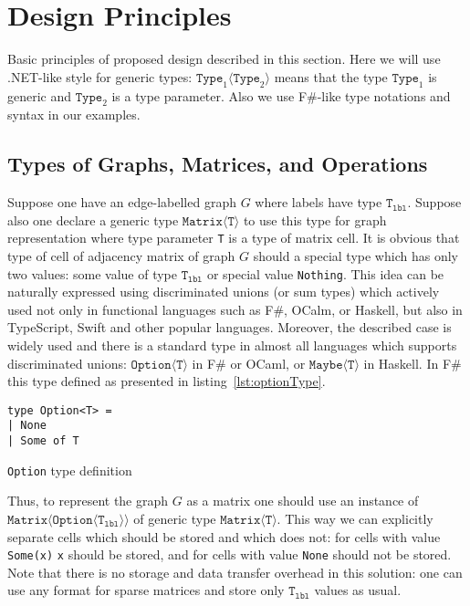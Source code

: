 \section{Design Principles}

Basic principles of proposed design described in this section.
Here we will use .NET-like style for generic types: $\texttt{Type}_1\langle\texttt{Type}_2\rangle$ means that the type $\texttt{Type}_1$ is generic and $\texttt{Type}_2$ is a type parameter.
Also we use F\#-like type notations and syntax in our examples.

\subsection{Types of Graphs, Matrices, and Operations}

Suppose one have an edge-labelled graph $G$ where labels have type $\texttt{T}_{\texttt{lbl}}$. 
Suppose also one declare a generic type $\texttt{Matrix} \langle \texttt{T} \rangle$ to use this type for graph representation where type parameter \texttt{T} is a type of matrix cell. 
It is obvious that type of cell of adjacency matrix of graph $G$ should a special type which has only two values: some value of type $\texttt{T}_{\texttt{lbl}}$ or special value \texttt{Nothing}.
This idea can be naturally expressed using discriminated unions (or sum types) which actively used not only in functional languages such as F\#, OCalm, or Haskell, but also in TypeScript, Swift and other popular languages. 
Moreover, the described case is widely used and there is a standard type in almost all languages which supports discriminated unions: $\texttt{Option} \langle \texttt{T} \rangle$ in F\# or OCaml, or $\texttt{Maybe} \langle \texttt{T} \rangle$ in Haskell. 
In F\# this type defined as presented in listing~\ref{lst:optionType}.

\begin{listing}[h]
\begin{verbatim}
type Option<T> =
| None
| Some of T
\end{verbatim}
\caption{\texttt{Option} type definition}
\label{lst:optionType}
\end{listing}


Thus, to represent the graph $G$ as a matrix one should use an instance of $\texttt{Matrix} \langle \texttt{Option}\langle \texttt{T}_{\texttt{lbl}} \rangle \rangle $  of generic type $\texttt{Matrix}\langle \texttt{T} \rangle$.
This way we can explicitly separate cells which should be stored and which does not: for cells with value \texttt{Some(x)} \texttt{x} should be stored, and for cells with value \texttt{None} should not be stored. Note that there is no storage and data transfer overhead in this solution: one can use any format for sparse matrices and store only $\texttt{T}_{\texttt{lbl}}$ values as usual.

